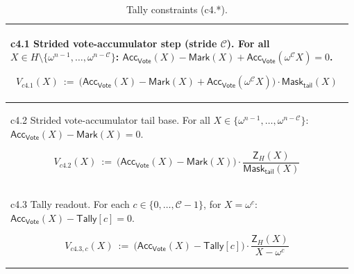 \begin{table}[t]
\small
\setlength{\tabcolsep}{3pt}
\renewcommand{\arraystretch}{1.05}
\caption{Tally constraints (c4.*).}
\label{tab:constraints-tally}
\begin{tabular}{@{}p{0.98\linewidth}@{}}
\toprule

c4.1 Strided vote-accumulator step (stride $\mathcal{C}$). For all
$X\in H\setminus\{\omega^{n-1},\dots,\omega^{n-\mathcal{C}}\}$:
$\mathsf{Acc}_{\mathsf{Vote}}(X)-\mathsf{Mark}(X)+\mathsf{Acc}_{\mathsf{Vote}}(\omega^{\mathcal{C}}X)=0$.
\begin{mdframed}[linewidth=0.6pt,backgroundcolor=verylightpink,innerleftmargin=6pt,innerrightmargin=6pt,innertopmargin=4pt,innerbottommargin=4pt]
\[
V_{c4.1}(X)\ :=\ \bigl(\mathsf{Acc}_{\mathsf{Vote}}(X)-\mathsf{Mark}(X)+\mathsf{Acc}_{\mathsf{Vote}}(\omega^{\mathcal{C}}X)\bigr)\cdot \mathsf{Mask}_{\mathsf{tail}}(X)
\]
\end{mdframed}
\\[-2mm]
\midrule

c4.2 Strided vote-accumulator tail base. For all
$X\in\{\omega^{n-1},\dots,\omega^{n-\mathcal{C}}\}$:
$\mathsf{Acc}_{\mathsf{Vote}}(X)-\mathsf{Mark}(X)=0$.
\begin{mdframed}[linewidth=0.6pt,backgroundcolor=verylightpink,innerleftmargin=6pt,innerrightmargin=6pt,innertopmargin=4pt,innerbottommargin=4pt]
\[
V_{c4.2}(X)\ :=\ \bigl(\mathsf{Acc}_{\mathsf{Vote}}(X)-\mathsf{Mark}(X)\bigr)\cdot \frac{\mathsf{Z}_H(X)}{\mathsf{Mask}_{\mathsf{tail}}(X)}
\]
\end{mdframed}
\\[-2mm]
\midrule

c4.3 Tally readout. For each $c\in\{0,\dots,\mathcal{C}-1\}$, for $X=\omega^{c}$:
$\mathsf{Acc}_{\mathsf{Vote}}(X)-\mathsf{Tally}[c]=0$.
\begin{mdframed}[linewidth=0.6pt,backgroundcolor=verylightpink,innerleftmargin=6pt,innerrightmargin=6pt,innertopmargin=4pt,innerbottommargin=4pt]
\[
V_{c4.3,c}(X)\ :=\ \bigl(\mathsf{Acc}_{\mathsf{Vote}}(X)-\mathsf{Tally}[c]\bigr)\cdot \frac{\mathsf{Z}_H(X)}{X-\omega^{c}}
\]
\end{mdframed}
\\[-2mm]

\bottomrule
\end{tabular}
\end{table}


